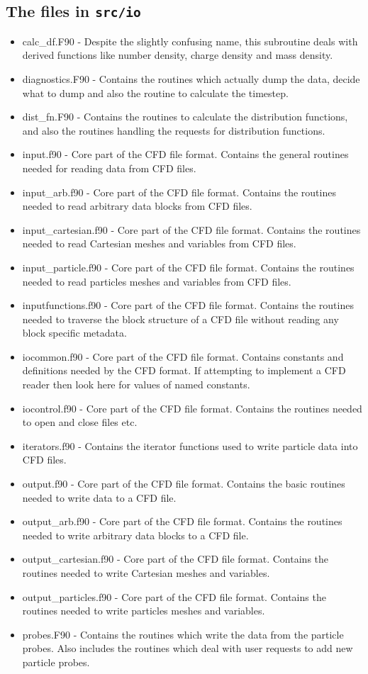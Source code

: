 \documentclass[12pt]{article}
\newcommand{\inlinecode}[1]{{\color{warwickred} \bf\texttt{#1}}}
\begin{document}
\subsection{The files in \inlinecode{src/io}}
\begin{itemize}
\item calc\_df.F90 - Despite the slightly confusing name, this subroutine
  deals with derived functions like number density, charge density and mass
  density.
\item diagnostics.F90 - Contains the routines which actually dump the data,
  decide what to dump and also the routine to calculate the timestep.
\item dist\_fn.F90 - Contains the routines to calculate the distribution
  functions, and also the routines handling the requests for distribution
  functions.
\item input.f90 - Core part of the CFD file format. Contains the general
  routines needed for reading data from CFD files.
\item input\_arb.f90 - Core part of the CFD file format. Contains the routines
  needed to read arbitrary data blocks from CFD files.
\item input\_cartesian.f90 - Core part of the CFD file format. Contains the
  routines needed to read Cartesian meshes and variables from CFD files.
\item input\_particle.f90 - Core part of the CFD file format. Contains the
  routines needed to read particles meshes and variables from CFD files.
\item inputfunctions.f90 - Core part of the CFD file format. Contains the
  routines needed to traverse the block structure of a CFD file without
  reading any block specific metadata.
\item iocommon.f90 - Core part of the CFD file format. Contains constants and
  definitions needed by the CFD format. If attempting to implement a CFD
  reader then look here for values of named constants.
\item iocontrol.f90 - Core part of the CFD file format. Contains the routines
  needed to open and close files etc.
\item iterators.f90 - Contains the iterator functions used to write particle
  data into CFD files.
\item output.f90 - Core part of the CFD file format. Contains the basic
  routines needed to write data to a CFD file.
\item output\_arb.f90 - Core part of the CFD file format. Contains the
  routines needed to write arbitrary data blocks to a CFD file.
\item output\_cartesian.f90 - Core part of the CFD file format. Contains the
  routines needed to write Cartesian meshes and variables.
\item output\_particles.f90 - Core part of the CFD file format. Contains the
  routines needed to write particles meshes and variables.
\item probes.F90 - Contains the routines which write the data from the
  particle probes. Also includes the routines which deal with user requests to
  add new particle probes.
\end{itemize}
\end{document}
